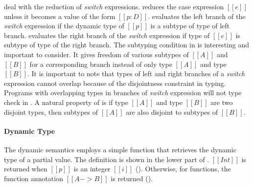  deal with the reduction
of \emph{switch} expressions.
 reduces the case expression $[[e]]$ unless it
becomes a value of the form $[[p:D]]$.  
 evaluates
the left branch of the \emph{switch} expression if the dynamic type of $[[p]]$ is
a subtype of type of left branch.   evaluates the right
branch of the \emph{switch} expression if type of $[[e]]$ is subtype
of type of the right branch. The subtyping condition in  is interesting and important to consider. It gives
freedom of various subtypes of $[[A]]$ and $[[B]]$ for a corresponding
branch instead of only type $[[A]]$ and type $[[B]]$. It is important
to note that types of left and right branches of a \emph{switch}
expression cannot overlap because of the disjointness constraint in
typing. 
Programs with overlapping types in branches of \emph{switch}
expression will not type check in \cal.
A natural property of \cal is
if type $[[A]]$ and type $[[B]]$ are two disjoint types, then subtypes
of $[[A]]$ are also disjoint to subtypes of $[[B]]$.

\paragraph{Dynamic Type}  The dynamic semantics employs a simple
function that retrieves the dynamic type of a partial value. 
The definition
is shown in the lower part of .
$[[Int]]$ is returned when $[[p]]$ is an integer $[[i]]$ ().
Otherwise, for functions, the function annotation $[[A -> B]]$ is returned
().

